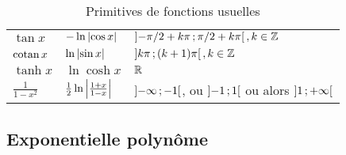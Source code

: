 \begin{table}[!h]
\begin{tabular}{|l|l|l|}
    \(\tan x\) & \(-\ln\left\lvert\cos x\right\rvert\) & 
    \(\left] -\pi/2+k\pi \, ;  \pi/2+k\pi \right[, k \in \mathbb{Z}\) \\
    \(\operatorname{cotan} x\)& \(\ln\left\lvert\sin x\right\rvert\) & \(\left] k\pi \, ;  (k+1)\pi \right[, k \in 
    \mathbb{Z}\) \\
    \(\tanh x\)& \(\ln\cosh x\) & \(\mathbb{R}\)\\
    \(\frac{1}{1-x^2}\) & \(\frac{1}{2} \ln\left\lvert\frac{1+x}{1-x}\right\rvert\) & 
    \(\left] -\infty \, ;  -1 \right[\), ou \(\left] -1 \, ;  1 \right[\) ou alors 
    \(\left] 1 \, ;  +\infty \right[\)\\
  \hline\end{tabular}
  \caption{Primitives de fonctions usuelles}
  \label{tab:primitivesusuelles}
\end{table}

\subsection{Exponentielle polynôme}

